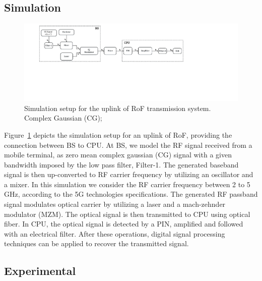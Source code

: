 \subsection{Simulation}
\begin{figure}[h!]
    \centering
    \includegraphics[width=\linewidth]{./sdf/radio_over_fiber/figures/block_diagram_flow.pdf}
    \caption{Simulation setup for the uplink of RoF transmission system. Complex Gaussian (CG); }
    \label{fig_RoFdiagram}
\end{figure}

 Figure~\ref{fig_RoFdiagram} depicts the simulation setup for an uplink of RoF, providing the connection between BS to CPU. At BS, we model the RF signal received from a mobile terminal, as zero mean complex gaussian (CG) signal with a given bandwidth imposed by the low pass filter, Filter-1. The generated baseband signal is then up-converted to RF carrier frequency by utilizing an oscillator and a mixer. In this simulation we consider the RF carrier frequency between 2 to 5 GHz, according to the 5G technologies specifications. The generated RF passband signal modulates optical carrier by utilizing a laser and a mach-zehnder modulator (MZM). The optical signal is then transmitted to CPU using optical fiber. In CPU, the optical signal is detected by a PIN, amplified and followed with an electrical filter. After these operations, digital signal processing techniques can be applied to recover the transmitted signal.




\subsection{Experimental}
